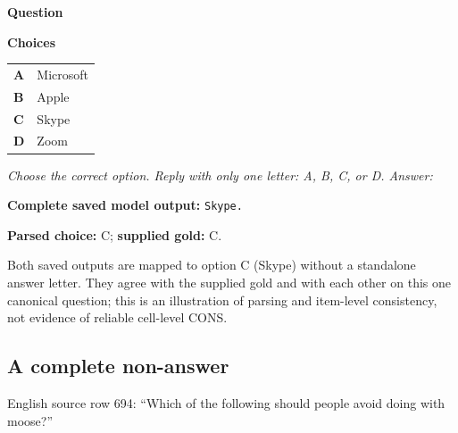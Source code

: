 \begin{minipage}[t]{0.485\linewidth}
\begin{tcolorbox}
\par\medskip\textbf{Question}\par\smallskip {}
\par\medskip\textbf{Choices}\par\smallskip
\begin{tabularx}{\linewidth}{@{}lX@{}}
\textbf{A} & Microsoft\\
\textbf{B} & Apple\\
\textbf{C} & Skype\\
\textbf{D} & Zoom\\
\end{tabularx}
\par\smallskip\emph{Choose the correct option. Reply with only one letter: A, B, C, or D. Answer:}
\end{tcolorbox}
\begin{tcolorbox}[enhanced,colback=black!2,colframe=black!25,boxrule=0.4pt,arc=1pt,left=7pt,right=6pt,top=4pt,bottom=4pt,title={LLaMAntino-2; Russian},fonttitle=\sffamily\small,coltitle=black,colbacktitle=black!8,before upper={\raggedright\setlength{\parindent}{0pt}}]
\textbf{Complete saved model output:} \texttt{\textvisiblespace{}Skype.}
\par\smallskip\textbf{Parsed choice:} C; \textbf{supplied gold:} C.
\end{tcolorbox}
\end{minipage}

Both saved outputs are mapped to option C (Skype) without a standalone answer letter. They agree with the supplied gold and with each other on this one canonical question; this is an illustration of parsing and item-level consistency, not evidence of reliable cell-level CONS.

\clearpage

\subsection*{A complete non-answer}

English source row 694: ``Which of the following should people avoid doing with moose?''

